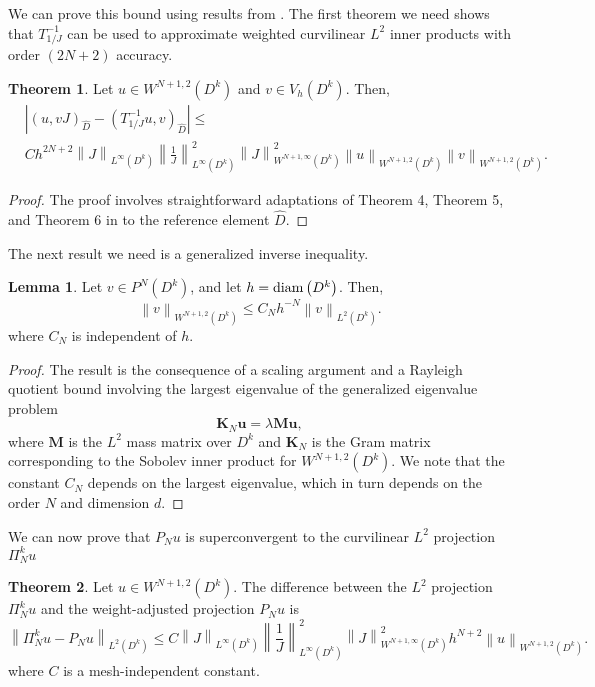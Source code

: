 \documentclass[preprint,10pt]{article}
\theoremstyle{definition}
\theoremstyle{lemma}
\newtheorem{lemma}{Lemma}
\theoremstyle{theorem}
\newtheorem{theorem}{Theorem}
\theoremstyle{assumption}
\renewcommand{\hat}{\widehat}
\newcommand{\nor}[1]{\left\| #1 \right\|}
\newcommand{\LRp}[1]{\left( #1 \right)}
\newcommand{\LRb}[1]{\left| #1 \right|}
\begin{document}
We can prove this bound using results from \cite{chan2016weight1,chan2016weight2}.  The first theorem we need shows that $T_{1/J}^{-1}$ can be used to approximate weighted curvilinear $L^2$ inner products with order $(2N+2)$ accuracy.  
\begin{theorem}
\label{thm:moment}
Let $u\in W^{N+1,2}\LRp{D^k}$ and $v\in V_h\LRp{D^k}$.  Then, 
\begin{align*}
&\LRb{\LRp{u,vJ}_{\hat{D}} - \LRp{T^{-1}_{1/J}u,v}_{\hat{D}}} \leq \\
&Ch^{2N+2}\nor{J}_{L^{\infty}\LRp{D^k}}  \nor{\frac{1}{J}}_{L^{\infty}\LRp{D^k}}^2 \nor{J}^2_{W^{N+1,\infty}\LRp{D^k}}\nor{u}_{W^{N+1,2}\LRp{D^k}}\nor{v}_{W^{N+1,2}\LRp{D^k}}.
\end{align*}
\end{theorem}
\begin{proof}
The proof involves straightforward adaptations of Theorem 4, Theorem 5, and Theorem 6 in \cite{chan2016weight1} to the reference element $\hat{D}$.  
\end{proof}
The next result we need is a generalized inverse inequality.  
\begin{lemma}
\label{lemma:sobolev}
Let $v \in P^N\LRp{D^k}$, and let $h = {\rm diam}\LRp{D^k}$.  Then,
\[
\nor{v}_{W^{N+1,2}\LRp{D^k}} \leq C_{N} h^{-N} \nor{v}_{L^2\LRp{D^k}}.
\]
where $C_{N}$ is independent of $h$.
\end{lemma}
\begin{proof}
The result is the consequence of a scaling argument and a Rayleigh quotient bound involving the largest eigenvalue of the generalized eigenvalue problem  
\[
\bm{K}_N\bm{u} = \lambda\bm{M}\bm{u},
\]
where $\bm{M}$ is the $L^2$ mass matrix over $D^k$ and $\bm{K}_N$ is the Gram matrix corresponding to the Sobolev inner product for $W^{N+1,2}\LRp{D^k}$.  We note that the constant $C_N$ depends on the largest eigenvalue, which in turn depends on the order $N$ and dimension $d$.  
\end{proof}

We can now prove that $P_Nu$ is superconvergent to the curvilinear $L^2$ projection $\Pi_N^k u$
\begin{theorem}
Let $u \in W^{N+1,2}\LRp{D^k}$.  The difference between the $L^2$ projection $\Pi^k_Nu$ and the weight-adjusted projection $P_Nu$ is
\[
\nor{\Pi_N^k u - P_N u}_{L^2\LRp{D^k}} \leq C\nor{J}_{L^{\infty}\LRp{D^k}}  \nor{\frac{1}{J}}_{L^{\infty}\LRp{D^k}}^2 \nor{J}^2_{W^{N+1,\infty}\LRp{D^k}} h^{N+2}\nor{u}_{W^{N+1,2}\LRp{D^k}}.
\]
where $C$ is a mesh-independent constant.
\end{theorem}
\end{document}
